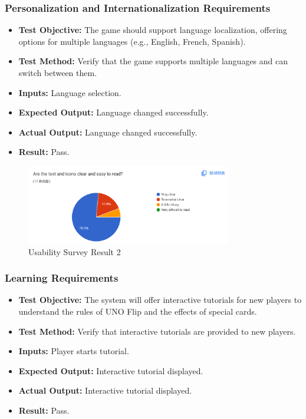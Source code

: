 \documentclass[12pt, titlepage]{article}
\begin{document}
\subsubsection{Personalization and Internationalization Requirements}
\begin{itemize}

        \item \textbf{Test Objective:} The game should support language localization, offering options for multiple languages (e.g., English, French, Spanish).
    \item \textbf{Test Method:} Verify that the game supports multiple languages and can switch between them.
    \item \textbf{Inputs:} Language selection.
    \item \textbf{Expected Output:} Language changed successfully.
    \item \textbf{Actual Output:} Language changed successfully.
    \item \textbf{Result:} Pass.
\end{itemize}

\begin{figure}[h!]
    \centering
    \includegraphics[width=0.8\textwidth]{image1.png}
    \caption{Usability Survey Result 2}
    \label{fig:labelname}
\end{figure}



\subsubsection{Learning Requirements}
\begin{itemize}
    \item \textbf{Test Objective:} The system will offer interactive tutorials for new players to understand the rules of UNO Flip and the effects of special cards.
    \item \textbf{Test Method:} Verify that interactive tutorials are provided to new players.
    \item \textbf{Inputs:} Player starts tutorial.
    \item \textbf{Expected Output:} Interactive tutorial displayed.
    \item \textbf{Actual Output:} Interactive tutorial displayed.
    \item \textbf{Result:} Pass.
\end{itemize}
\end{document}
